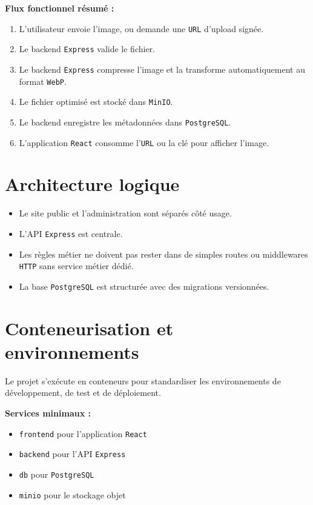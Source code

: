 \documentclass[11pt,a4paper]{scrreprt}
\newcommand{\code}[1]{\texttt{#1}}
\begin{document}
\textbf{Flux fonctionnel résumé :}
\begin{enumerate}
  \item L'utilisateur envoie l'image, ou demande une \code{URL} d'upload signée.
  \item Le backend \code{Express} valide le fichier.
  \item Le backend \code{Express} compresse l'image et la transforme automatiquement au format \code{WebP}.
  \item Le fichier optimisé est stocké dans \code{MinIO}.
  \item Le backend enregistre les métadonnées dans \code{PostgreSQL}.
  \item L'application \code{React} consomme l'\code{URL} ou la clé pour afficher l'image.
\end{enumerate}

\section{Architecture logique}
\begin{itemize}
  \item Le site public et l'administration sont séparés côté usage.
  \item L'API \code{Express} est centrale.
  \item Les règles métier ne doivent pas rester dans de simples routes ou middlewares \code{HTTP} sans service métier dédié.
  \item La base \code{PostgreSQL} est structurée avec des migrations versionnées.
\end{itemize}

\section{Conteneurisation et environnements}
Le projet s'exécute en conteneurs pour standardiser les environnements de développement, de test et de déploiement.

\textbf{Services minimaux :}
\begin{itemize}
  \item \code{frontend} pour l'application \code{React}
  \item \code{backend} pour l'API \code{Express}
  \item \code{db} pour \code{PostgreSQL}
  \item \code{minio} pour le stockage objet
\end{itemize}
\end{document}
